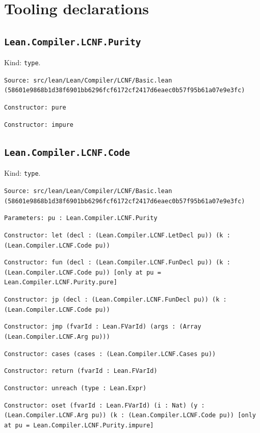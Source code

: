 \documentclass[11pt]{article}
\begin{document}
\section*{Tooling declarations}
\subsection*{\texttt{Lean.Compiler.LCNF.Purity}}
\noindent Kind: \texttt{type}.\par
\noindent \texttt{Source: src/lean/Lean/Compiler/LCNF/Basic.lean (58601e9868b1d38f6901bb6296fcf6172cf2417d6eaec0b57f95b61a07e9e3fc)}\par
\noindent \texttt{Constructor: pure }\par
\noindent \texttt{Constructor: impure }\par
\subsection*{\texttt{Lean.Compiler.LCNF.Code}}
\noindent Kind: \texttt{type}.\par
\noindent \texttt{Source: src/lean/Lean/Compiler/LCNF/Basic.lean (58601e9868b1d38f6901bb6296fcf6172cf2417d6eaec0b57f95b61a07e9e3fc)}\par
\noindent \texttt{Parameters: pu : Lean.Compiler.LCNF.Purity}\par
\noindent \texttt{Constructor: let (decl : (Lean.Compiler.LCNF.LetDecl pu)) (k : (Lean.Compiler.LCNF.Code pu))}\par
\noindent \texttt{Constructor: fun (decl : (Lean.Compiler.LCNF.FunDecl pu)) (k : (Lean.Compiler.LCNF.Code pu)) [only at pu = Lean.Compiler.LCNF.Purity.pure]}\par
\noindent \texttt{Constructor: jp (decl : (Lean.Compiler.LCNF.FunDecl pu)) (k : (Lean.Compiler.LCNF.Code pu))}\par
\noindent \texttt{Constructor: jmp (fvarId : Lean.FVarId) (args : (Array (Lean.Compiler.LCNF.Arg pu)))}\par
\noindent \texttt{Constructor: cases (cases : (Lean.Compiler.LCNF.Cases pu))}\par
\noindent \texttt{Constructor: return (fvarId : Lean.FVarId)}\par
\noindent \texttt{Constructor: unreach (type : Lean.Expr)}\par
\noindent \texttt{Constructor: oset (fvarId : Lean.FVarId) (i : Nat) (y : (Lean.Compiler.LCNF.Arg pu)) (k : (Lean.Compiler.LCNF.Code pu)) [only at pu = Lean.Compiler.LCNF.Purity.impure]}\par
\end{document}

